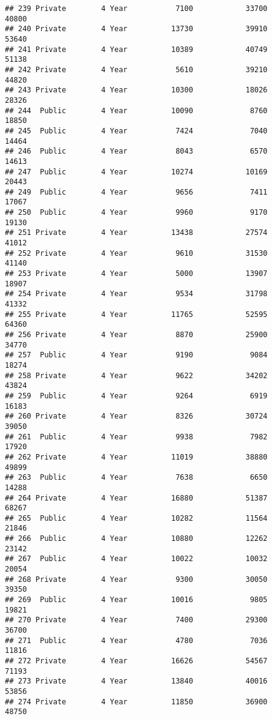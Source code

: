 \documentclass[
]{article}
\begin{document}
\begin{verbatim}
## 239 Private        4 Year           7100            33700          40800
## 240 Private        4 Year          13730            39910          53640
## 241 Private        4 Year          10389            40749          51138
## 242 Private        4 Year           5610            39210          44820
## 243 Private        4 Year          10300            18026          28326
## 244  Public        4 Year          10090             8760          18850
## 245  Public        4 Year           7424             7040          14464
## 246  Public        4 Year           8043             6570          14613
## 247  Public        4 Year          10274            10169          20443
## 249  Public        4 Year           9656             7411          17067
## 250  Public        4 Year           9960             9170          19130
## 251 Private        4 Year          13438            27574          41012
## 252 Private        4 Year           9610            31530          41140
## 253 Private        4 Year           5000            13907          18907
## 254 Private        4 Year           9534            31798          41332
## 255 Private        4 Year          11765            52595          64360
## 256 Private        4 Year           8870            25900          34770
## 257  Public        4 Year           9190             9084          18274
## 258 Private        4 Year           9622            34202          43824
## 259  Public        4 Year           9264             6919          16183
## 260 Private        4 Year           8326            30724          39050
## 261  Public        4 Year           9938             7982          17920
## 262 Private        4 Year          11019            38880          49899
## 263  Public        4 Year           7638             6650          14288
## 264 Private        4 Year          16880            51387          68267
## 265  Public        4 Year          10282            11564          21846
## 266  Public        4 Year          10880            12262          23142
## 267  Public        4 Year          10022            10032          20054
## 268 Private        4 Year           9300            30050          39350
## 269  Public        4 Year          10016             9805          19821
## 270 Private        4 Year           7400            29300          36700
## 271  Public        4 Year           4780             7036          11816
## 272 Private        4 Year          16626            54567          71193
## 273 Private        4 Year          13840            40016          53856
## 274 Private        4 Year          11850            36900          48750

\end{verbatim}
\end{document}
